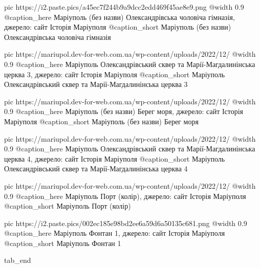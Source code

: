 	pic https://i2.paste.pics/a45ec7f244b9a9dcc2edd469f45ae8e9.png
	@width 0.9
	@caption_here Маріуполь (без назви) Олександрівська чоловіча гімназія, джерело: сайт Історія Маріуполя
	@caption_short Маріуполь (без назви) Олександрівська чоловіча гімназія

	pic https://mariupol.dev-for-web.com.ua/wp-content/uploads/2022/12/%
	@width 0.9
	@caption_here Маріуполь Олександрівський сквер та Марії-Магдалинінська церква 3, джерело: сайт Історія Маріуполя
	@caption_short Маріуполь Олександрівський сквер та Марії-Магдалинінська церква 3

	pic https://mariupol.dev-for-web.com.ua/wp-content/uploads/2022/12/%
	@width 0.9
	@caption_here Маріуполь (без назви) Берег моря, джерело: сайт Історія Маріуполя
	@caption_short Маріуполь (без назви) Берег моря

	pic https://mariupol.dev-for-web.com.ua/wp-content/uploads/2022/12/%
	@width 0.9
	@caption_here Маріуполь Олександрівський сквер та Марії-Магдалинінська церква 4, джерело: сайт Історія Маріуполя
	@caption_short Маріуполь Олександрівський сквер та Марії-Магдалинінська церква 4

	pic https://mariupol.dev-for-web.com.ua/wp-content/uploads/2022/12/%
	@width 0.9
	@caption_here Маріуполь Порт (колір), джерело: сайт Історія Маріуполя
	@caption_short Маріуполь Порт (колір)

	pic https://i2.paste.pics/002ec185e98bd2ee6a59d6a50135c681.png
	@width 0.9
	@caption_here Маріуполь Фонтан 1, джерело: сайт Історія Маріуполя
	@caption_short Маріуполь Фонтан 1

	tab_end
\fi
